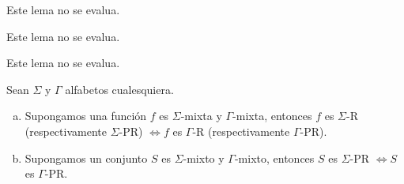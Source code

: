   \begin{lemma}
    \PN Este lema no se evalua.
  \end{lemma}

  \begin{lemma}
    \PN Este lema no se evalua.
  \end{lemma}

  \begin{lemma}
    \PN Este lema no se evalua.
  \end{lemma}

  \begin{theorem}
    \PN Sean $\Sigma$ y $\Gamma$ alfabetos cualesquiera.

    \begin{enumerate}[a)]
      \item Supongamos una función $f$ es $\Sigma$-mixta y $\Gamma$-mixta, entonces $f$ es $\Sigma$-R (respectivamente
        $\Sigma$-PR) $\Leftrightarrow f$ es $\Gamma$-R (respectivamente $\Gamma$-PR).
      \item Supongamos un conjunto $S$ es $\Sigma$-mixto y $\Gamma$-mixto, entonces $S$ es $\Sigma$-PR $\Leftrightarrow
        S$ es $\Gamma$-PR.
    \end{enumerate}
  \end{theorem}
